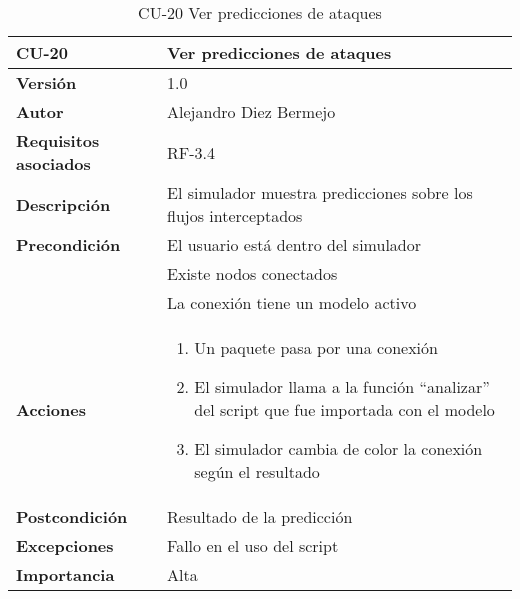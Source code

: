 \begin{table}[p]
	\centering
	\begin{tabularx}{\linewidth}{ p{} p{} }
		\toprule
		\textbf{CU-20}    & \textbf{Ver predicciones de ataques}\\
		\toprule
		\textbf{Versión}              & 1.0    \\
		\textbf{Autor}                & Alejandro Diez Bermejo \\
		\textbf{Requisitos asociados} & RF-3.4 \\
		\textbf{Descripción}          & El simulador muestra predicciones sobre los flujos interceptados \\
        \textbf{Precondición}         & El usuario está dentro del simulador \\
                                      & Existe nodos conectados \\
                                      & La conexión tiene un modelo activo \\
		\textbf{Acciones}             &
		\begin{enumerate}
			\def\labelenumi{\arabic{enumi}.}
			\tightlist
			\item Un paquete pasa por una conexión
            \item El simulador llama a la función ``analizar'' del script que fue importada con el modelo
            \item El simulador cambia de color la conexión según el resultado
		\end{enumerate}\\
		\textbf{Postcondición}        & Resultado de la predicción \\
		\textbf{Excepciones}          & Fallo en el uso del script \\
		\textbf{Importancia}          & Alta \\
		\bottomrule
	\end{tabularx}
	\caption{CU-20 Ver predicciones de ataques}
\end{table}

